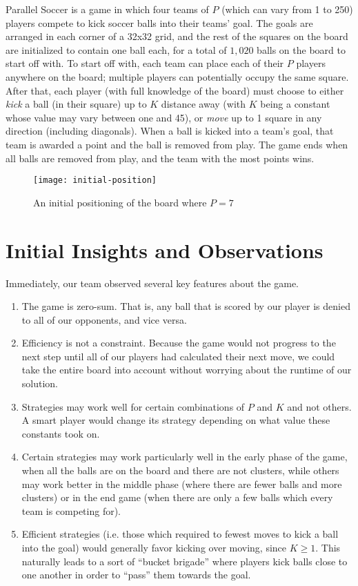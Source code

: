 \documentclass[
10pt, %
letterpaper, %
oneside, %
headinclude,footinclude, %
english
]{article}
\begin{document}
Parallel Soccer is a game in which four teams of $P$ (which can vary from 1 to 250) players compete to kick soccer balls into their teams' goal. The goals are arranged in each corner of a 32x32 grid, and the rest of the squares on the board are initialized to contain one ball each, for a total of $1,020$ balls on the board to start off with. To start off with, each team can place each of their $P$ players anywhere on the board; multiple players can potentially occupy the same square. After that, each player (with full knowledge of the board) must choose to either \textit{kick} a ball (in their square) up to $K$ distance away (with $K$ being a constant whose value may vary between one and 45), or \textit{move} up to 1 square in any direction (including diagonals). When a ball is kicked into a team's goal, that team is awarded a point and the ball is removed from play. The game ends when all balls are removed from play, and the team with the most points wins.

\begin{figure}[ht!]
\centering 
\texttt{[image: initial-position]} 
\caption[Initial board of a parallel football game]{An initial positioning of the board where $P=7$}
\label{fig:gallery} 
\end{figure}
\pagebreak

\section{Initial Insights and Observations}

Immediately, our team observed several key features about the game. 

\begin{enumerate}
  \item The game is zero-sum. That is, any ball that is scored by our player is denied to all of our opponents, and vice versa.
  \item Efficiency is not a constraint. Because the game would not progress to the next step until all of our players had calculated their next move, we could take the entire board into account without worrying about the runtime of our solution.
  \item Strategies may work well for certain combinations of $P$ and $K$ and not others. A smart player would change its strategy depending on what value these constants took on.
  \item Certain strategies may work particularly well in the early phase of the game, when all the balls are on the board and there are not clusters, while others may work better in the middle phase (where there are fewer balls and more clusters) or in the end game (when there are only a few balls which every team is competing for).
  \item Efficient strategies (i.e. those which required to fewest moves to kick a ball into the goal) would generally favor kicking over moving, since $K \geq 1$. This naturally leads to a sort of ``bucket brigade'' where players kick balls close to one another in order to ``pass'' them towards the goal.
\end{enumerate}
\end{document}
